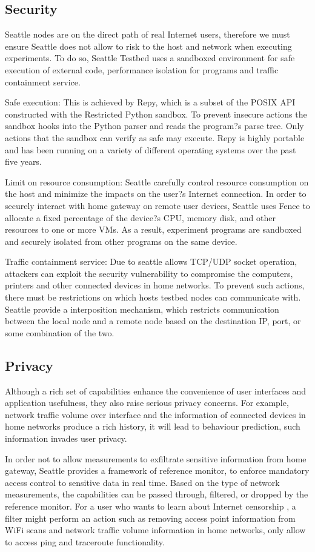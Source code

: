 \subsection{Security}
Seattle nodes are on the direct path of real Internet users, therefore we must ensure Seattle does not allow to risk to the host and network when executing experiments. To do so, Seattle Testbed uses a sandboxed environment for safe execution of external code, performance isolation for programs and traffic containment service. 

Safe execution: This is achieved by Repy, which is a subset of the POSIX API constructed with the Restricted Python sandbox. To prevent insecure actions the sandbox hooks into the Python parser and reads the program?s parse tree. Only actions that the sandbox can verify as safe may execute. Repy is highly portable and has been running on a variety of different operating systems over the past five years.

Limit on resource consumption: Seattle carefully control resource consumption on the host and minimize the impacts on the user?s Internet connection. In order to securely interact with home gateway on remote user devices, Seattle uses Fence to allocate a fixed percentage of the device?s CPU, memory disk, and other resources to one or more VMs. As a result, experiment programs are sandboxed and securely isolated from other programs on the same device. 

Traffic containment service: Due to seattle allows TCP/UDP socket operation, attackers can exploit the security vulnerability to compromise the computers, printers and other connected devices in home networks. To prevent such actions, there must be restrictions on which hosts testbed nodes can communicate with. Seattle provide a interposition mechanism, which restricts communication between the local node and a remote node based on the destination IP, port, or some combination of the two. 

\subsection{Privacy}
Although a rich set of capabilities enhance the convenience of user interfaces and application usefulness, they also raise serious privacy concerns. For example, network traffic volume over interface and the information of connected devices in home networks produce a rich history, it will lead to behaviour prediction, such information invades user privacy. 

In order not to allow measurements to exfiltrate sensitive information from home gateway, Seattle provides a framework of reference monitor, to enforce mandatory access control to sensitive data in real time. Based on the type of network measurements, the capabilities can be passed through, filtered, or dropped by the reference monitor. For a user who wants to learn about Internet censorship , a filter might perform an action such as removing access point information from WiFi scans and network traffic volume information in home networks, only allow to access ping and traceroute functionality.